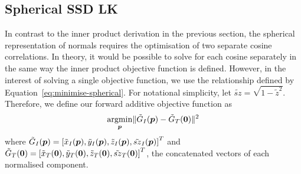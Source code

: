 \subsection{Spherical SSD LK}\label{subsec:lk-spherical}
In contrast to the inner product derivation in the previous section, the spherical representation of normals requires the optimisation of two separate cosine correlations. In theory, it would be possible to solve for each cosine separately in the same way the inner product objective function is defined. However, in the interest of solving a single objective function, we use the relationship defined by Equation~\ref{eq:minimise-spherical}. For notational simplicity, let $\tilde{sz} = \sqrt{1 - \tilde{z}^2}$. Therefore, we define our forward additive objective function as
\begin{equation}\label{eq:spher-ssd}
    \argmin_{\p} \norm{\tilde{G}_I(\p) - \tilde{G}_T(\zero)}^2
\end{equation}
where $\tilde{G}_I(\boldsymbol{p}) = \left[  \tilde{x}_I(\boldsymbol{p}), \tilde{y}_I(\boldsymbol{p}), \tilde{z}_I(\boldsymbol{p}), \tilde{sz}_I(\boldsymbol{p}) \right]^T$ and $\tilde{G}_T(\boldsymbol{0}) = \left[ \tilde{x}_T(\boldsymbol{0}), \tilde{y}_T(\boldsymbol{0}), \tilde{z}_T(\boldsymbol{0}), \tilde{sz}_T(\boldsymbol{0}) \right]^T$, the concatenated vectors of each normalised component.

